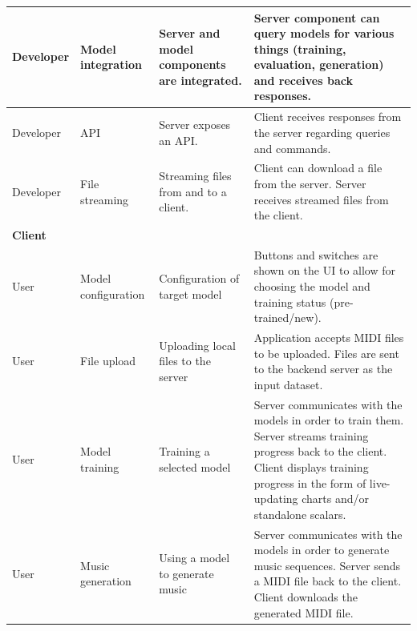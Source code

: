 \documentclass{article}
\begin{document}
\begin{center}
\begin{tabular}{ |p{}|p{}|p{}|p{}| }
        \hline
        Developer & Model integration   & Server and model components are integrated. & Server component can query models for various things (training, evaluation, generation) and receives back responses.                                                                                              \\
        \hline
        Developer & API                 & Server exposes an API.                      & Client receives responses from the server regarding queries and commands.                                                                                                                                         \\
        \hline
        Developer & File streaming      & Streaming files from and to a client.       & Client can download a file from the server. Server receives streamed files from the client.                                                                                                                       \\
        \hline
        \multicolumn{4}{|l|}{\textbf{Client}}                                                                                                                                                                                                                                                             \\
        \hline
        User      & Model configuration & Configuration of target model               & Buttons and switches are shown on the UI to allow for choosing the model and training status (pre-trained/new).                                                                                                   \\
        \hline
        User      & File upload         & Uploading local files to the server         & Application accepts MIDI files to be uploaded. Files are sent to the backend server as the input dataset.                                                                                                         \\
        \hline
        User      & Model training      & Training a selected model                   & Server communicates with the models in order to train them. Server streams training progress back to the client. Client displays training progress in the form of live-updating charts and/or standalone scalars. \\
        \hline
        User      & Music generation    & Using a model to generate music             & Server communicates with the models in order to generate music sequences. Server sends a MIDI file back to the client. Client downloads the generated MIDI file.                                                  \\
        \hline
    \end{tabular}
\end{center}
\end{document}
